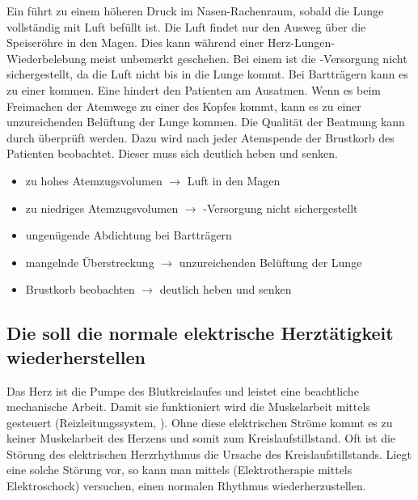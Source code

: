 {
Ein  führt zu einem höheren
Druck im Nasen-Rachenraum, sobald die Lunge vollständig mit
Luft befüllt ist. Die Luft findet nur den Ausweg über die
Speiseröhre in den Magen. Dies kann während einer
Herz-Lungen-Wiederbelebung meist unbemerkt geschehen. Bei
einem  ist die
-Versorgung nicht sichergestellt, da die Luft nicht
bis in die Lunge kommt. Bei Bartträgern kann es zu einer
 kommen. Eine  hindert den Patienten am Ausatmen. Wenn es
beim Freimachen der Atemwege zu einer  des Kopfes kommt, kann es zu einer
unzureichenden Belüftung der Lunge kommen. Die Qualität der
Beatmung kann durch 
überprüft werden. Dazu wird nach jeder Atemspende der
Brustkorb des Patienten beobachtet. Dieser muss sich
deutlich heben und senken.
}{
\begin{itemize}
  \item zu hohes Atemzugsvolumen ${\rightarrow}$ Luft in den Magen
  \item zu niedriges Atemzugsvolumen ${\rightarrow}$ -Versorgung nicht
  sichergestellt
  \item ungenügende Abdichtung bei Bartträgern
  \item mangelnde Überstreckung ${\rightarrow}$ unzureichenden Belüftung der
  Lunge
  \item Brustkorb beobachten ${\rightarrow}$ deutlich heben und senken
\end{itemize}
}{}{}{}

\subsection{Die  soll die normale elektrische Herztätigkeit wiederherstellen}


\Text
{{\TxBeschreibung}}%
{%
\label{topic:defibrillation-bls}%
Das Herz ist die Pumpe des Blutkreislaufes und leistet eine
beachtliche mechanische Arbeit. Damit sie funktioniert wird
die Muskelarbeit mittels  gesteuert
(Reizleitungssystem,
). Ohne diese
elektrischen Ströme kommt es zu keiner Muskelarbeit des
Herzens und somit zum Kreislaufstillstand.
Oft ist die Störung des elektrischen Herzrhythmus die
Ursache des Kreislaufstillstands. Liegt eine solche Störung
vor, so kann man mittels 
(Elektrotherapie mittels Elektroschock) versuchen, einen normalen Rhythmus
wiederherzustellen.
}%


